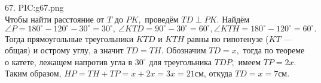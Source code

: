 67. {{PIC:g67.png}}\\
Чтобы найти расстояние от $T$ до $PK,$ проведём $TD\perp PK.$ Найдём $\angle P=180^\circ-120^\circ-30^\circ=30^\circ,\ \angle KTD=90^\circ-30^\circ=60^\circ, \angle KTH=180^\circ-120^\circ=60^\circ.$ Тогда прямоугольные треугольники $KTD$ и $KTH$ равны по гипотенузе ($KT$ --- общая) и острому углу, а значит $TD=TH.$ Обозначим $TD=x,$ тогда по теореме о катете, лежащем напротив угла в $30^\circ$ для треугольника $TDP,$ имеем $TP=2x.$ Таким образом, $HP=TH+TP=x+2x=3x=21$см, откуда $TD=x=7$см.\\

